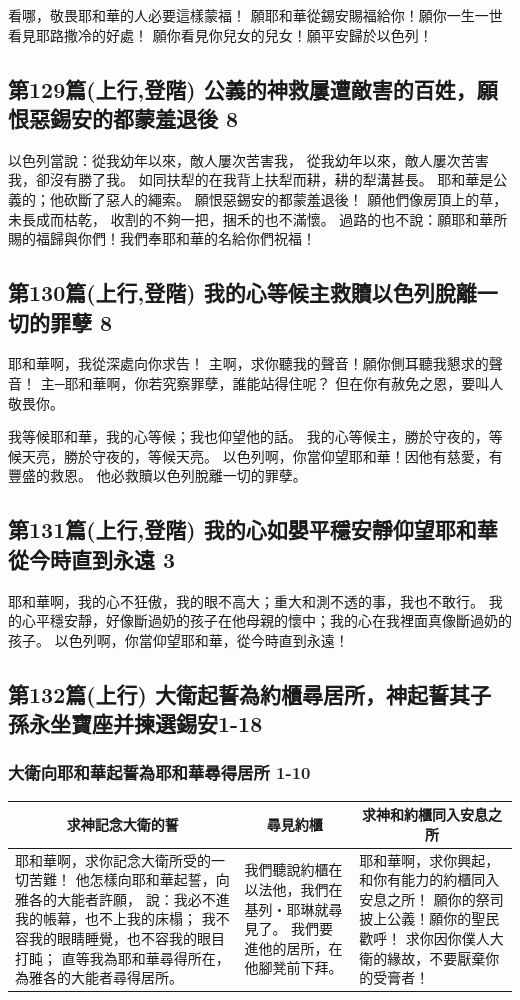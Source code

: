 看哪，敬畏耶和華的人必要這樣蒙福！
願耶和華從錫安賜福給你！願你一生一世看見耶路撒冷的好處！
願你看見你兒女的兒女！願平安歸於以色列！



\subsection{第129篇(上行,登階) 公義的神救屢遭敵害的百姓，願恨惡錫安的都蒙羞退後 8}
以色列當說：從我幼年以來，敵人屢次苦害我，
從我幼年以來，敵人屢次苦害我，卻沒有勝了我。
如同扶犁的在我背上扶犁而耕，耕的犁溝甚長。
耶和華是公義的；他砍斷了惡人的繩索。
願恨惡錫安的都蒙羞退後！
願他們像房頂上的草，未長成而枯乾，
收割的不夠一把，捆禾的也不滿懷。
過路的也不說：願耶和華所賜的福歸與你們！我們奉耶和華的名給你們祝福！



\subsection{第130篇(上行,登階) 我的心等候主救贖以色列脫離一切的罪孽 8}
耶和華啊，我從深處向你求告！
主啊，求你聽我的聲音！願你側耳聽我懇求的聲音！
主─耶和華啊，你若究察罪孽，誰能站得住呢？
但在你有赦免之恩，要叫人敬畏你。

我等候耶和華，我的心等候；我也仰望他的話。
我的心等候主，勝於守夜的，等候天亮，勝於守夜的，等候天亮。
以色列啊，你當仰望耶和華！因他有慈愛，有豐盛的救恩。
他必救贖以色列脫離一切的罪孽。


\subsection{第131篇(上行,登階) 我的心如嬰平穩安靜仰望耶和華從今時直到永遠 3}
耶和華啊，我的心不狂傲，我的眼不高大；重大和測不透的事，我也不敢行。
我的心平穩安靜，好像斷過奶的孩子在他母親的懷中；我的心在我裡面真像斷過奶的孩子。
以色列啊，你當仰望耶和華，從今時直到永遠！


\subsection{第132篇(上行) 大衛起誓為約櫃尋居所，神起誓其子孫永坐寶座并揀選錫安1-18}
\subsubsection{大衛向耶和華起誓為耶和華尋得居所 1-10}
\begin{table}[H]
\centering
\begin{tabular}{p{}|p{3.00cm}|p{5.00cm}}\hline\hline
\multicolumn{1}{c|}{求神記念大衛的誓}&\multicolumn{1}{c|}{尋見約櫃}&\multicolumn{1}{c}{求神和約櫃同入安息之所}\\\hline
耶和華啊，求你記念大衛所受的一切苦難！
他怎樣向耶和華起誓，向雅各的大能者許願，
說：我必不進我的帳幕，也不上我的床榻；
我不容我的眼睛睡覺，也不容我的眼目打盹；
直等我為耶和華尋得所在，為雅各的大能者尋得居所。
&我們聽說約櫃在以法他，我們在基列‧耶琳就尋見了。
我們要進他的居所，在他腳凳前下拜。
&耶和華啊，求你興起，和你有能力的約櫃同入安息之所！
願你的祭司披上公義！願你的聖民歡呼！
求你因你僕人大衛的緣故，不要厭棄你的受膏者！\\\hline
\end{tabular}
\end{table} 

